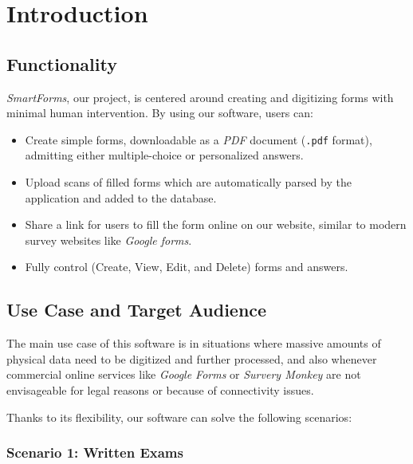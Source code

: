 \documentclass[11pt, a4paper]{report}
\def\code#1{\texttt{#1}}
\begin{document}
\tableofcontents

\cleardoublepage
\pagestyle{main}
\let\ps@plain\ps@main


\chapter{Introduction}
\label{chapter-introduction}

\section{Functionality}

\textit{SmartForms}, our project, is centered around creating and digitizing forms with minimal human intervention. By using our software, users can:
\begin{itemize}
    \item Create simple forms, downloadable as a \textit{PDF} document (\code{.pdf} format), admitting either multiple-choice or personalized answers.
    \item Upload scans of filled forms which are automatically parsed by the application and added to the database.
    \item Share a link for users to fill the form online on our website, similar to modern survey websites like \textit{Google forms}.
    \item Fully control (Create, View, Edit, and Delete) forms and answers.
\end{itemize}

\section{Use Case and Target Audience}

The main use case of this software is in situations where massive amounts of physical data need to be digitized and further processed, and also whenever commercial online services like \textit{Google Forms} or \textit{Survery Monkey} are not envisageable for legal reasons or because of connectivity issues.

Thanks to its flexibility, our software can solve the following scenarios:

\subsection*{Scenario 1: Written Exams}
\end{document}
